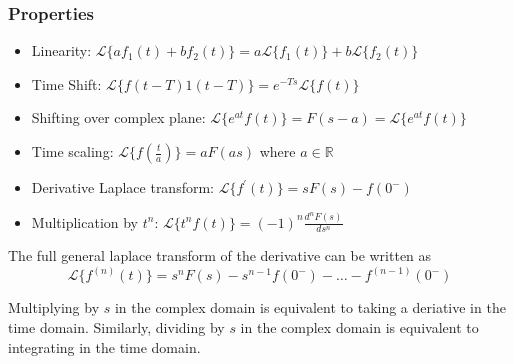 \documentclass[11pt]{article}
\begin{document}
\subsubsection{Properties}
\begin{itemize}
  \item Linearity: $\mathcal{L} \{ a f_1(t) + b f_2(t) \} = a \mathcal{L} \{ f_1(t) \} + b \mathcal{L} \{ f_2(t) \} $
  \item Time Shift: $\mathcal{L} \{ f(t-T)1(t-T) \}  = e^{-Ts} \mathcal{L} \{ f(t) \}$
  \item Shifting over complex plane: $\mathcal{L} \{ e^{at} f(t) \} = F(s-a) = \mathcal{L} \{ e^{at} f(t) \}$
  \item Time scaling: $\mathcal{L} \{ f(\frac{t}{a}) \} = a F(as)$ where $a \in \mathbb{R}$
  \item Derivative Laplace transform: $\mathcal{L} \{f^\prime (t)\} = sF(s) - f(0^{-}) $
  \item Multiplication by $t^n$: $\mathcal{L} \{ t^n f(t) \} = (-1)^n \frac{d^n F(s)}{d s^n } $
\end{itemize}

The full general laplace transform of the derivative can be written as 
\begin{equation}
  \mathcal{L} \{ f^{(n)} (t) \} = s^n F(s) - s^{n-1} f(0^-) - \dots - f^{(n-1)} (0^-)
\end{equation}

Multiplying by $s$ in the complex domain is equivalent to taking a deriative in the time domain.
Similarly, dividing by $s$ in the complex domain is equivalent to integrating in the time domain.
\end{document}
